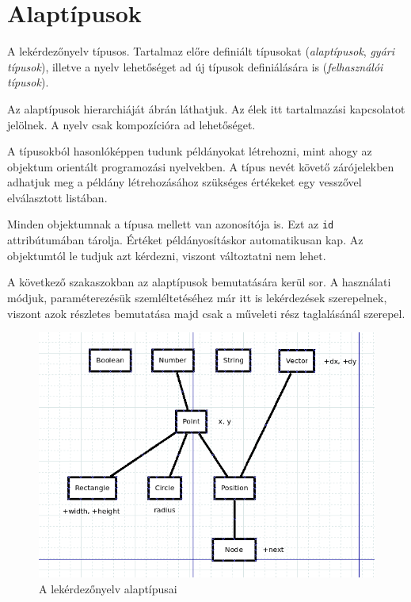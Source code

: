 
\section{Alaptípusok}

A lekérdezőnyelv típusos. Tartalmaz előre definiált típusokat (\textit{alaptípusok}, \textit{gyári típusok}), illetve a nyelv lehetőséget ad új típusok definiálására is (\textit{felhasználói típusok}).

Az alaptípusok hierarchiáját  ábrán láthatjuk. Az élek itt tartalmazási kapcsolatot jelölnek. A nyelv csak kompozícióra ad lehetőséget.

A típusokból hasonlóképpen tudunk példányokat létrehozni, mint ahogy az objektum orientált programozási nyelvekben. A típus nevét követő zárójelekben adhatjuk meg a példány létrehozásához szükséges értékeket egy vesszővel elválasztott listában.

Minden objektumnak a típusa mellett van azonosítója is. Ezt az \texttt{id} attribútumában tárolja. Értéket példányosításkor automatikusan kap. Az objektumtól le tudjuk azt kérdezni, viszont változtatni nem lehet.

A következő szakaszokban az alaptípusok bemutatására kerül sor. A használati módjuk, paraméterezésük szemléltetéséhez már itt is lekérdezések szerepelnek, viszont azok részletes bemutatása majd csak a műveleti rész taglalásánál szerepel.

\begin{figure}[htb]
\begin{center}
    \includegraphics[scale=0.5]{images/types}
    \caption{A lekérdezőnyelv alaptípusai}
    \label{fig:types}
\end{center}
\end{figure}

